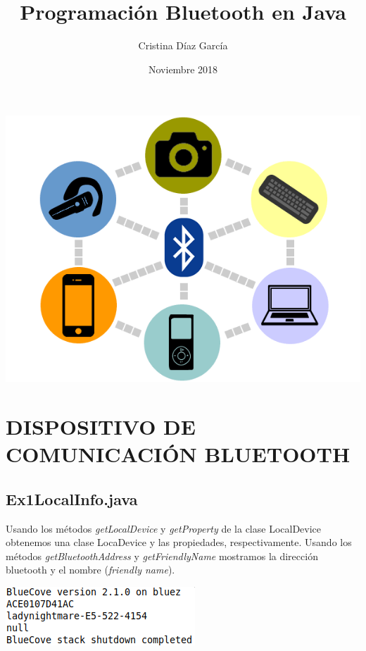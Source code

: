 \documentclass{article}
\title{Programación Bluetooth en Java}
\author{Cristina Díaz García}
\date{Noviembre 2018}
\begin{document}

\begin{titlingpage}
\maketitle

\begin{center}
\includegraphics[scale=0.5]{imagenes/Bluetooth.png} 
\end{center}

\end{titlingpage}

\newpage

\tableofcontents

\newpage

\section{DISPOSITIVO DE COMUNICACIÓN BLUETOOTH}

\subsection{Ex1LocalInfo.java}

Usando los métodos \textit{getLocalDevice} y \textit{getProperty} de la clase LocalDevice obtenemos una clase LocaDevice y las propiedades, respectivamente. Usando los métodos \textit{getBluetoothAddress} y \textit{getFriendlyName} mostramos la dirección bluetooth y el nombre (\textit{friendly name}).

\begin{flushleft}
	\includegraphics[scale=0.75]{imagenes/Ex1LocalInfo.png} 
\end{flushleft}
\end{document}
